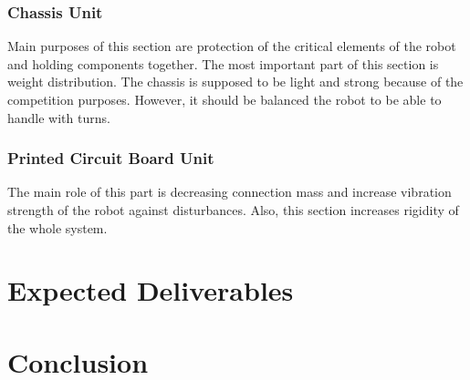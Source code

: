 \documentclass[a4paper,12pt]{article}
\begin{document}
\subsubsection{Chassis Unit}
Main purposes of this section are protection of the critical elements of the robot and holding components together. The most important part of this section is weight distribution. The chassis is supposed to be light and strong because of the competition purposes. However, it should be balanced the robot to be able to handle with turns. 
\subsubsection{Printed Circuit Board Unit}
The main role of this part is decreasing connection mass and increase vibration strength of the robot against disturbances. Also, this section increases rigidity of the whole system. 

\section{Expected Deliverables}


\section{Conclusion}

\newpage
\begin{appendices}
	
		
		

	
\end{appendices}
\end{document}
